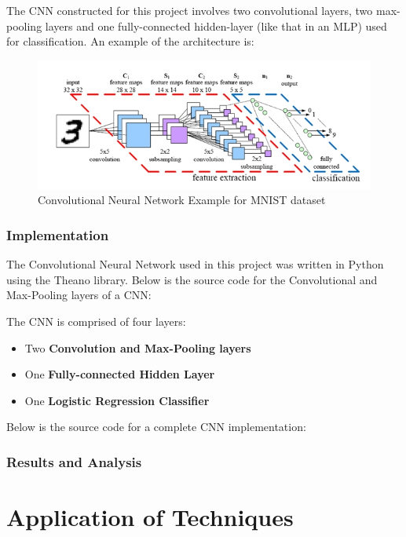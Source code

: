 \documentclass{article}
\begin{document}
  The CNN constructed for this project involves two convolutional layers, two max-pooling layers and one fully-connected
  hidden-layer (like that in an MLP) used for classification. An example of the architecture is: \\
  \FloatBarrier
  \begin{figure}[h]
    \caption{Convolutional Neural Network Example for MNIST dataset}
    \centering
    \includegraphics[scale=0.65]{images/architecture_cnn_example}
  \end{figure}
  \FloatBarrier
  
  \subsubsection{Implementation}
  
  The Convolutional Neural Network used in this project was written in Python using the Theano library. Below is the source
  code for the Convolutional and Max-Pooling layers of a CNN:
  
  \vspace{3mm}
  The CNN is comprised of four layers:
  \begin{itemize}
    \item Two \textbf{Convolution and Max-Pooling layers}
    \item One \textbf{Fully-connected Hidden Layer}
    \item One \textbf{Logistic Regression Classifier}
  \end{itemize}
  Below is the source code for a complete CNN implementation:
  
  
  \subsubsection{Results and Analysis}
  
\newpage
\section{Application of Techniques}
\end{document}
